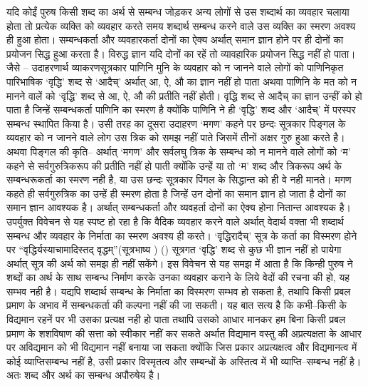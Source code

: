 यदि कोईं पुरुष किसी शब्द का अर्थ से सम्बन्ध जोड़कर अन्य लोगों से उस शब्दार्थ का व्यवहार चलाया होता तो प्रत्येक व्यक्ति को व्यवहार करते समय शब्दार्थ सम्बन्ध करने वाले उस व्यक्ति का स्मरण अवश्य ही हुआ होता। सम्बन्धकर्ता और व्यवहारकर्ता दोनों का ऐक्य अर्थात् समान ज्ञान होने पर ही दोनों का प्रयोजन सिद्ध हुआ करता है। विरुद्ध ज्ञान यदि दोनों का रहें तो व्यावहारिक प्रयोजन सिद्ध नहीं हो पाता। जैसे – उदाहरणार्थ व्याकरणसूत्रकार पाणिनि मुनि के व्यवहार को न जानने वाले लोगों को पाणिनिकृत पारिभाषिक ‘वृद्धि' शब्द से ‘आदैच्' अर्थात् आ, ऐ, औ का ज्ञान नहीं हो पाता अथवा पाणिनि के मत को न मानने वालें को ‘वृद्धि' शब्द से आ, ऐ, औ की प्रतीति नहीं होती। वृद्धि शब्द से आदैच् का ज्ञान उन्हीं को हो पाता है जिन्हें सम्बन्धकर्ता पाणिनि का स्मरण है क्योंकि पाणिनि ने ही ‘वृद्धि' शब्द और ‘आदैच्' में परस्पर सम्बन्ध स्थापित किया है। उसी तरह का दूसरा उदाहरण ‘मगण' कहने पर छन्दः सूत्रकार पिङ्गल के व्यवहार को न जानने वाले लोग उस त्रिक को समझ नहीं पाते जिसमें तीनों अक्षर गुरु हुआ करते है। अथवा पिङ्गल की कृति– अर्थात् ‘मगण' और सर्वलघु त्रिक के सम्बन्ध को न मानने वाले लोगों को ‘म' कहने से सर्वगुरुत्रिकरूप की प्रतीति नहीं हो पाती क्योंकि उन्हें या तो ‘म' शब्द और त्रिकरूप अर्थ के सम्बन्धरूकर्ता का स्मरण नही है, या उस छन्दः सूत्रकार पिंगल के सिद्धान्त को ही वे नही मानते। मगण कहते ही सर्वगुरुत्रिक का उन्हें ही स्मरण होता है जिन्हें उन दोनों का समान ज्ञान हो जाता है दोनों का समान ज्ञान आवश्यक है। अर्थात् सम्बन्धकर्ता और व्यवहर्ता दोनों का ऐक्य होना नितान्त आवश्यक है। उपर्युक्त विवेचन से यह स्पष्ट हो रहा है कि वैदिक व्यवहार करने वाले अर्थात् वेदार्थ वक्ता भी शब्दार्थ सम्बन्ध और व्यवहार के निर्माता का स्मरण अवश्य ही करते। ‘वृद्धिरादैच्' सूत्र के कर्ता का विस्मरण होने पर “वृद्धिर्यस्याचामादिस्तद् वृद्धम्”(सूत्रभाष्य ) () सूत्रगत ‘वृद्धि' शब्द से कुछ भी ज्ञान नहीं हो पायेगा अर्थात् सूत्र की अर्थ को समझ ही नहीं सकेंगे। इस विवेचन से यह समझ में आता है कि किन्ही पुरुष ने शब्दों का अर्थ के साथ सम्बन्ध निर्माण करके उनका व्यवहार कराने के लिये वेदों की रचना की हो, यह सम्भव नही है। यद्यपि शब्दार्थ सम्बन्ध के निर्माता का विस्मरण सम्भव हो सकता है, तथापि किसी प्रबल प्रमाण के अभाव में सम्बन्धकर्ता की कल्पना नहीं की जा सकती। यह बात सत्य है कि कभी–किसी के विद्यमान रहनें पर भी उसका प्रत्यक्ष नही हो पाता तथापि उसको आधार मानकर हम बिना किसी प्रबल प्रमाण के शशविषाण की सत्ता को स्वीकार नहीं कर सकते अर्थात विद्यमान वस्तु की अप्रत्यक्षता के आधार पर अविद्यमान को भी विद्यमान नहीं बनाया जा सकता क्योंकि जिस प्रकार अप्रत्यक्षत्व और विद्यमानत्व में कोई व्याप्तिसम्बन्ध नहीं है, उसी प्रकार विस्मृतत्व और सम्बन्धों के अस्तित्व में भी व्याप्ति–सम्बन्ध नहीं है। अतः शब्द और अर्थ का सम्बन्ध अपौरुषेय है।

